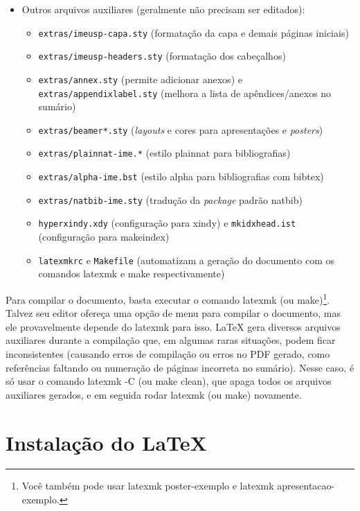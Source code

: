 \begin{itemize}
  \item Outros arquivos auxiliares (geralmente não precisam ser editados):
  \begin{itemize}
    \item \texttt{extras/imeusp-capa.sty} (formatação da capa e demais páginas iniciais)
    \item \texttt{extras/imeusp-headers.sty} (formatação dos cabeçalhos)
    \item \texttt{extras/annex.sty} (permite adicionar anexos) e
          \texttt{extras/appendixlabel.sty} (melhora a lista de
          apêndices/anexos no sumário)
    \item \texttt{extras/beamer*.sty} (\textit{layouts} e cores para
          apresentações e \textit{posters})
    \item \texttt{extras/plainnat-ime.*} (estilo plainnat para bibliografias)
    \item \texttt{extras/alpha-ime.bst} (estilo alpha para bibliografias com
          bibtex)
    \item \texttt{extras/natbib-ime.sty} (tradução da \textit{package}
          padrão natbib)
    \item \texttt{hyperxindy.xdy} (configuração para xindy) e
          \texttt{mkidxhead.ist} (configuração para makeindex)
    \item \texttt{latexmkrc} e \texttt{Makefile} (automatizam a geração do
          documento com os comandos \textsf{latexmk} e \textsf{make} respectivamente)
  \end{itemize}
\end{itemize}

Para compilar o documento, basta executar o comando \textsf{latexmk} (ou
\textsf{make})\footnote{Você também pode usar \textsf{latexmk poster-exemplo}
e \textsf{latexmk apresentacao-exemplo}.}. Talvez seu editor ofereça uma
opção de menu para compilar o documento, mas ele provavelmente depende do
\textsf{latexmk} para isso. \LaTeX{} gera diversos arquivos auxiliares
durante a compilação que, em algumas raras situações, podem ficar
inconsistentes (causando erros de compilação ou erros no PDF gerado, como
referências faltando ou numeração de páginas incorreta no sumário). Nesse
caso, é só usar o comando \textsf{latexmk -C} (ou \textsf{make clean}),
que apaga todos os arquivos auxiliares gerados, e em seguida rodar
\textsf{latexmk} (ou \textsf{make}) novamente.

\section{Instalação do \LaTeX{}}


